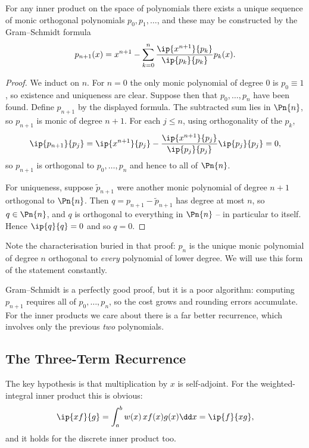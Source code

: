 \begin{theorem}\label{thm:opexist}
  For any inner product on the space of polynomials there exists a unique sequence of monic orthogonal polynomials $p_0, p_1, \dots$, and these may be constructed by the Gram--Schmidt formula
  $$
  p_{n+1}(x) = x^{n+1} - \sum_{k=0}^{n}\frac{\ip{x^{n+1}}{p_k}}{\ip{p_k}{p_k}}p_k(x).
  $$
\end{theorem}
\begin{proof}
  We induct on $n$. For $n = 0$ the only monic polynomial of degree $0$ is $p_0 \equiv 1$, so existence and uniqueness are clear. Suppose then that $p_0, \dots, p_n$ have been found. Define $p_{n+1}$ by the displayed formula. The subtracted sum lies in $\Pn{n}$, so $p_{n+1}$ is monic of degree $n+1$. For each $j \leq n$, using orthogonality of the $p_k$,
  $$
  \ip{p_{n+1}}{p_j} = \ip{x^{n+1}}{p_j} - \frac{\ip{x^{n+1}}{p_j}}{\ip{p_j}{p_j}}\ip{p_j}{p_j} = 0,
  $$
  so $p_{n+1}$ is orthogonal to $p_0, \dots, p_n$ and hence to all of $\Pn{n}$.

  For uniqueness, suppose $\tilde p_{n+1}$ were another monic polynomial of degree $n+1$ orthogonal to $\Pn{n}$. Then $q = p_{n+1} - \tilde p_{n+1}$ has degree at most $n$, so $q \in \Pn{n}$, and $q$ is orthogonal to everything in $\Pn{n}$ -- in particular to itself. Hence $\ip{q}{q} = 0$ and so $q = 0$.
\end{proof}

\begin{remark}
  Note the characterisation buried in that proof: $p_n$ is the unique monic polynomial of degree $n$ orthogonal to \emph{every} polynomial of lower degree. We will use this form of the statement constantly.
\end{remark}

Gram--Schmidt is a perfectly good proof, but it is a poor algorithm: computing $p_{n+1}$ requires all of $p_0, \dots, p_n$, so the cost grows and rounding errors accumulate. For the inner products we care about there is a far better recurrence, which involves only the previous \emph{two} polynomials.

\subsection{The Three-Term Recurrence}

The key hypothesis is that multiplication by $x$ is self-adjoint. For the weighted-integral inner product this is obvious:
$$
\ip{xf}{g} = \int_a^b w(x)\, x f(x) g(x) \dd x = \ip{f}{xg},
$$
and it holds for the discrete inner product too.

